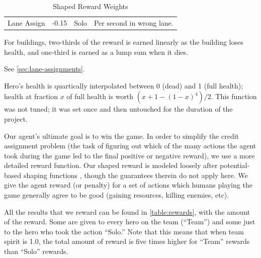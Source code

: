 \documentclass[ocean-paper.tex]{subfiles}
\begin{document}
\begin{table}
\begin{threeparttable}
\begin{tabular}{c|c|c|p{8cm}}
    Lane Assign\tnote{$\dagger$}  & -0.15 & Solo & Per second in wrong lane. \\
\end{tabular}
\begin{tablenotes}
    \item[*] For buildings, two-thirds of the reward is earned linearly as the building loses health, and one-third is earned as a lump sum when it dies.
    \item[$\dagger$] See \autoref{sec:lane-assignments}.
    \item[$\ddagger$] Hero's health is quartically interpolated between 0 (dead) and 1 (full health); health at fraction $x$ of full health is worth $\left(x + 1 - (1-x)^4\right)/2$. This function was not tuned; it was set once and then untouched for the duration of the project.
\end{tablenotes}
\end{threeparttable}
\caption{Shaped Reward Weights}
\label{table:rewards}
\end{table}

Our agent's ultimate goal is to win the game.
In order to simplify the credit assignment problem (the task of figuring out which of the many actions the agent took during the game led to the final positive or negative reward), we use a more detailed reward function.
Our shaped reward is modeled loosely after potential-based shaping functions \cite{Ng99policyinvariance}, though the guarantees therein do not apply here. 
We give the agent reward (or penalty) for a set of actions which humans playing the game generally agree to be good (gaining resources, killing enemies, etc). 


All the results that we reward can be found in \autoref{table:rewards}, with the amount of the reward. Some are given to every hero on the team (``Team'') and some just to the hero who took the action ``Solo.'' Note that this means that when team spirit is 1.0, the total amount of reward is five times higher for ``Team'' rewards than ``Solo'' rewards.
\end{document}
